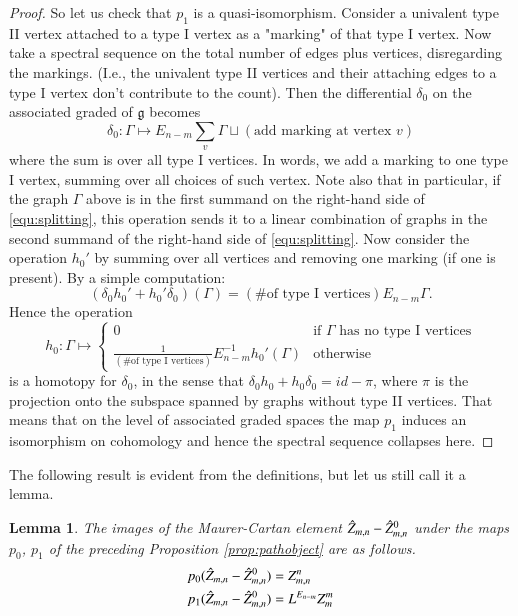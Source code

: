 \documentclass[a4paper]{amsart}
\theoremstyle{plain}
\newtheorem{lemma}[thm]{Lemma}
\theoremstyle{definition}
\newcommand{\alg}[1]{\mathfrak{{#1}}}
\begin{document}
\begin{proof}
So let us check that $p_1$ is a quasi-isomorphism.
Consider a univalent type II vertex attached to a type I vertex as a "marking" of that type I vertex.
Now take a spectral sequence on the total number of edges plus vertices, disregarding the markings. (I.e., the univalent type II vertices and their attaching edges to a type I vertex don't contribute to the count).
Then the differential $\delta_0$ on the associated graded of $\alg g$ becomes
\[
\delta_0 : \Gamma \mapsto E_{n-m} \sum_v \Gamma \sqcup(\text{add marking at vertex $v$})
\]
where the sum is over all type I vertices. In words, we add a marking to one type I vertex, summing over all choices of such vertex.
Note also that in particular, if the graph $\Gamma$ above is in the first summand on the right-hand side of \eqref{equ:splitting}, this operation sends it to a linear combination of graphs in the second summand of the right-hand side of \eqref{equ:splitting}.
Now consider the operation $h_0'$ by summing over all vertices and removing one marking (if one is present).
By a simple computation:
\[
(\delta_0 h_0' + h_0' \delta_0)(\Gamma) = (\text{\# of type I vertices}) E_{n-m} \Gamma.
\]
Hence the operation 
\[
h_0: \Gamma \mapsto
\begin{cases}
0 & \text{if $\Gamma$ has no type I vertices}\\
\frac 1 {(\text{\# of type I vertices})} E_{n-m}^{-1} h_0'(\Gamma) &\text{otherwise}
\end{cases}
\]
is a homotopy for $\delta_0$, in the sense that $\delta_0 h_0 + h_0\delta_0=\mathit{id}-\pi$, where $\pi$ is the projection onto the subspace spanned by graphs without type II vertices. That means that on the level of associated graded spaces the map $p_1$ induces an isomorphism on cohomology
and hence the spectral sequence collapses here. 
\end{proof}

The following result is evident from the definitions, but let us still call it a lemma.
\begin{lemma}\label{lem:MCelementspath}
The images of the Maurer-Cartan element $\hat Z_{m,n}-\hat Z_{m,n}^0$ under the maps $p_0$, $p_1$ of the preceding Proposition \ref{prop:pathobject} are as follows.
\begin{align*}
p_0(\hat Z_{m,n}-\hat Z_{m,n}^0) &= Z_{m,n}^n \\
p_1(\hat Z_{m,n}-\hat Z_{m,n}^0) &= L^{E_{n-m}} Z_{m}^m 
\end{align*}
\end{lemma}
\end{document}
